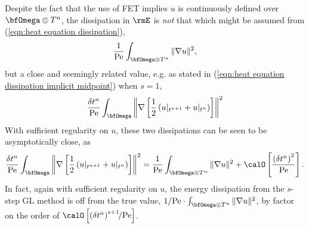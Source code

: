     Despite the fact that the use of FET implies $u$ is continuously defined over $\bfOmega\otimes T^{n}$, the dissipation in $\rmE$ is \emph{not} that which might be assumed from (\ref{eqn:heat equation dissipation}),
    \begin{equation}
        \frac{1}{\rmPe}\int_{\bfOmega\otimes T^{n}}\|\nabla u\|^{2},
    \end{equation}
    but a close and seemingly related value, e.g. as stated in (\ref{eqn:heat equation dissipation implicit midpoint}) when $s = 1$,
    \begin{equation}
        \frac{\delta t^{n}}{\rmPe}\int_{\bfOmega}\left\|\nabla\left[\frac{1}{2}\left(u|_{t^{n + 1}} + u|_{t^{n}}\right)\right]\right\|^{2}
    \end{equation}
    With sufficient regularity on $u$, these two dissipations can be seen to be asymptotically close, as
    \begin{equation}
      \frac{\delta t^{n}}{\rmPe}\int_{\bfOmega}\left\|\nabla\left[\frac{1}{2}\left(u|_{t^{n + 1}} + u|_{t^{n}}\right)\right]\right\|^{2}  =  \frac{1}{\rmPe}\int_{\bfOmega\otimes T^{n}}\|\nabla u\|^{2} + \calO\left[\frac{\left(\delta t^{n}\right)^{2}}{\rmPe}\right].
    \end{equation}
    In fact, again with sufficient regularity on $u$, the energy dissipation from the $s$-step GL method is off from the true value, $1/\rmPe\cdot\int_{\bfOmega\otimes T^{n}}\|\nabla u\|^{2}$, by factor on the order of $\calO\left[\left(\delta t^{n}\right)^{s + 1}\!\!/\rmPe\right]$.
